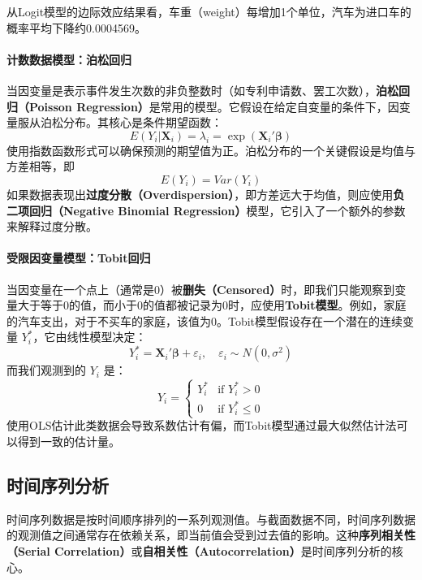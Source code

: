 从Logit模型的边际效应结果看，车重（weight）每增加1个单位，汽车为进口车的概率平均下降约0.0004569。

\paragraph*{计数数据模型：泊松回归}
当因变量是表示事件发生次数的非负整数时（如专利申请数、罢工次数），\textbf{泊松回归（Poisson Regression）}是常用的模型。它假设在给定自变量的条件下，因变量服从泊松分布。其核心是条件期望函数：
\begin{equation}
E(Y_i | \mathbf{X}_i) = \lambda_i = \exp(\mathbf{X}_i'\boldsymbol{\beta})
\end{equation}
使用指数函数形式可以确保预测的期望值为正。泊松分布的一个关键假设是均值与方差相等，即
\[
E(Y_i)=Var(Y_i)
\]
如果数据表现出\textbf{过度分散（Overdispersion）}，即方差远大于均值，则应使用\textbf{负二项回归（Negative Binomial Regression）}模型，它引入了一个额外的参数来解释过度分散。

\paragraph*{受限因变量模型：Tobit回归}
当因变量在一个点上（通常是0）被\textbf{删失（Censored）}时，即我们只能观察到变量大于等于0的值，而小于0的值都被记录为0时，应使用\textbf{Tobit模型}。例如，家庭的汽车支出，对于不买车的家庭，该值为0。Tobit模型假设存在一个潜在的连续变量 $Y_i^*$，它由线性模型决定：
\begin{equation}
Y_i^* = \mathbf{X}_i'\boldsymbol{\beta} + \varepsilon_i, \quad \varepsilon_i \sim N(0, \sigma^2)
\end{equation}
而我们观测到的 $Y_i$ 是：
\begin{equation}
Y_i =
\begin{cases}
Y_i^* & \text{if } Y_i^* > 0 \\
0 & \text{if } Y_i^* \leq 0
\end{cases}
\end{equation}
使用OLS估计此类数据会导致系数估计有偏，而Tobit模型通过最大似然估计法可以得到一致的估计量。

\subsection{时间序列分析}
时间序列数据是按时间顺序排列的一系列观测值。与截面数据不同，时间序列数据的观测值之间通常存在依赖关系，即当前值会受到过去值的影响。这种\textbf{序列相关性（Serial Correlation）}或\textbf{自相关性（Autocorrelation）}是时间序列分析的核心。

